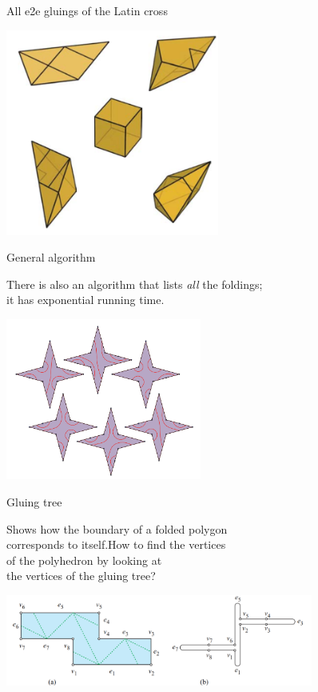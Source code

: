\documentclass[17pt]{extarticle}
\newcommand{\newslide}[1]{\newpage \begin{center} \large #1
                          \end{center} \vspace{-5.5mm}}
\begin{document}
\newslide{All e2e gluings of the Latin cross}

\begin{center}
	\includegraphics[width=7cm]{minilec/latincross}
\end{center}

\newslide{General algorithm} \vspace{-2mm}

There is also an algorithm that lists {\it all} the foldings; \\
it has exponential running time. \vspace{-5mm}

\begin{center}
	\includegraphics[height=5.3cm]{minilec/4star}
\end{center}

\newslide{Gluing tree} \vspace{-3mm}

Shows how the boundary of a folded polygon \\
corresponds to itself.\quad How to find the vertices \\
of the polyhedron by looking at \\
the vertices of the gluing tree?

\begin{center}
	\includegraphics[height=3cm]{minilec/gtreerec}
\end{center}
\end{document}
